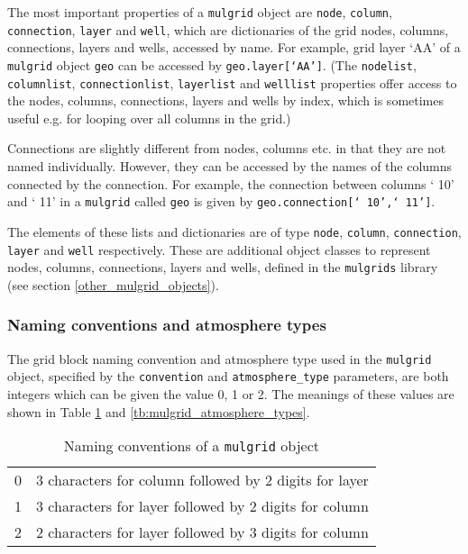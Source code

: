 The most important properties of a \texttt{mulgrid} object are \texttt{node}, \texttt{column}, \texttt{connection}, \texttt{layer} and \texttt{well}, which are dictionaries of the grid nodes, columns, connections, layers and wells, accessed by name.  For example, grid layer `AA' of a \texttt{mulgrid} object \texttt{geo} can be accessed by \texttt{geo.layer[`AA']}.  (The \texttt{nodelist}, \texttt{columnlist}, \texttt{connectionlist}, \texttt{layerlist} and \texttt{welllist} properties offer access to the nodes, columns, connections, layers and wells by index, which is sometimes useful e.g. for looping over all columns in the grid.)

Connections are slightly different from nodes, columns etc. in that they are not named individually.  However, they can be accessed by the names of the columns connected by the connection.  For example, the connection between columns ` 10' and ` 11' in a \texttt{mulgrid} called \texttt{geo} is given by \texttt{geo.connection[` 10',` 11']}.

The elements of these lists and dictionaries are of type \texttt{node}, \texttt{column}, \texttt{connection}, \texttt{layer} and \texttt{well} respectively.  These are additional object classes to represent nodes, columns, connections, layers and wells, defined in the \texttt{mulgrids} library (see section \ref{other_mulgrid_objects}).

\subsubsection{Naming conventions and atmosphere types}

The grid block naming convention and atmosphere type used in the \texttt{mulgrid} object, specified by the \texttt{convention} and \texttt{atmosphere\_type} parameters, are both integers which can be given the value 0, 1 or 2.  The meanings of these values are shown in Table \ref{tb:mulgrid_conventions} and \ref{tb:mulgrid_atmosphere_types}.

\begin{table}
  \begin{center}
    \begin{tabular}{|l|l|}
      \hline
      0 & 3 characters for column followed by 2 digits for layer \\
      1 & 3 characters for layer followed by 2 digits for column \\
      2 & 2 characters for layer followed by 3 digits for column \\
      \hline
    \end{tabular}
    \caption{Naming conventions of a \texttt{mulgrid} object}
    \label{tb:mulgrid_conventions}
  \end{center}
\end{table}

